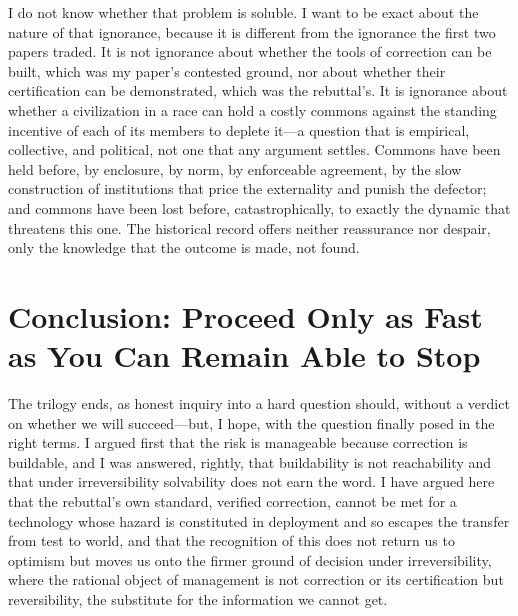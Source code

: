 \documentclass[11pt]{article}
\begin{document}
I do not know whether that problem is soluble. I want to be exact about the nature of that ignorance, because it is different from the ignorance the first two papers traded. It is not ignorance about whether the tools of correction can be built, which was my paper's contested ground, nor about whether their certification can be demonstrated, which was the rebuttal's. It is ignorance about whether a civilization in a race can hold a costly commons against the standing incentive of each of its members to deplete it---a question that is empirical, collective, and political, not one that any argument settles. Commons have been held before, by enclosure, by norm, by enforceable agreement, by the slow construction of institutions that price the externality and punish the defector; and commons have been lost before, catastrophically, to exactly the dynamic that threatens this one. The historical record offers neither reassurance nor despair, only the knowledge that the outcome is made, not found.

\section{Conclusion: Proceed Only as Fast as You Can Remain Able to Stop}
\label{sec:conclusion}

The trilogy ends, as honest inquiry into a hard question should, without a verdict on whether we will succeed---but, I hope, with the question finally posed in the right terms. I argued first that the risk is manageable because correction is buildable, and I was answered, rightly, that buildability is not reachability and that under irreversibility solvability does not earn the word. I have argued here that the rebuttal's own standard, verified correction, cannot be met for a technology whose hazard is constituted in deployment and so escapes the transfer from test to world, and that the recognition of this does not return us to optimism but moves us onto the firmer ground of decision under irreversibility, where the rational object of management is not correction or its certification but reversibility, the substitute for the information we cannot get.
\end{document}
